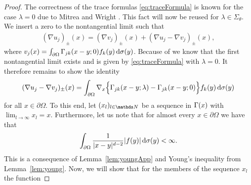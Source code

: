 \begin{proof}
  The correctness of the trace formulas \eqref{eq:traceFormula} is known for the case $\lambda = 0$ due to Mitrea and Wright \cite[Prop.\@~4.4]{mitreaWright}.
  This fact will now be reused for $\lambda \in \Sigma_\theta$.
  We insert a zero to the nontangential limit such that
  \begin{align*}
    (\nabla u_j)_\pm(x) = 
    (\nabla v_j)_\pm(x) + (\nabla u_j - \nabla v_j)_\pm(x),
  \end{align*}
  where $v_j(x) = \int_{\partial\Omega} \Gamma_{jk}(x - y; 0) f_k(y) \, {\operatorname{d}\!{\sigma}}(y)$.
  Because of \cite{mitreaWright} we know that the first nontangential limit exists and is given by \eqref{eq:traceFormula} with $\lambda = 0$.
  It therefore remains to show the identity
  \begin{align*}
    (\nabla u_j - \nabla v_j)_\pm(x) = \int_{\partial\Omega} \nabla_x \Big\{ \Gamma_{jk}(x - y; \lambda) - \Gamma_{jk}(x - y; 0) \Big\} f_k(y) \, {\operatorname{d}\!{\sigma}}(y)
  \end{align*}
  for all $x \in \partial \Omega$.
  To this end, let $(x_l)_{l \in \N}$ be a sequence in $\Gamma(x)$ with $\lim_{l \to \infty} x_l = x$.
  Furthermore, let us note that for almost every $x \in \partial\Omega$ we have that 
  \begin{align*}
    \int_{\partial\Omega} \frac{1}{|x - y|^{d - 2}} |f(y)| \, {\operatorname{d}\!{\sigma}}(y) < \infty.
  \end{align*}
  This is a consequence of Lemma~\ref{lem:youngApp} and Young's inequality from Lemma~\ref{lem:young}.
  Now, we will show that for the members of the sequence $x_l$ the function

\end{proof}
